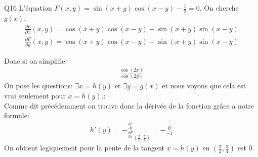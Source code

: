 \begin{parag}{Q16}
    L'équation $F\left(x, y\right) = \sin\left(x + y\right)\cos\left(x-y\right) - \frac{1}{2} = 0$. On cherche $g\left(x\right)$.\\
\begin{align*} \frac{\partial F}{\partial x}\left(x, y\right) = \cos\left(x + y\right)\cos\left(x-y\right) - \sin\left(x + y\right)\sin\left(x-y\right) \end{align*}
\begin{align*} \frac{\partial F}{\partial y}\left(x, y\right) = \cos\left(x + y\right)\cos\left(x-y\right) + \sin\left(x+y\right)\sin\left(x-y\right) \end{align*}

Donc si on simplifie:
\begin{align*} \frac{\cos\left(2x\right)}{\cos\left(2y\right)} \end{align*}
    On pose les questions: $\exists x =  h\left(y\right)$ et $\exists y =  g\left(x\right)$ et nous voyons que cela est vrai seulement pour $x = h\left(y\right)$.:\\
Comme dit précédemment on trouve donc la dérivée de la fonction grâce a notre formule:
\begin{align*} h'\left(y\right) = - \frac{\frac{\partial F}{\partial y}}{\frac{\partial F}{\partial x}}_{\left(\frac{\pi}{2}, \frac{\pi}{4}\right)} = -\frac{0}{-1}\end{align*}
On obtient logiquement pour la pente de la tangent $x =  h\left(y\right)$ en $\left(\frac{\pi}{2}, \frac{\pi}{4}\right)$ est $0$.

\end{parag}





